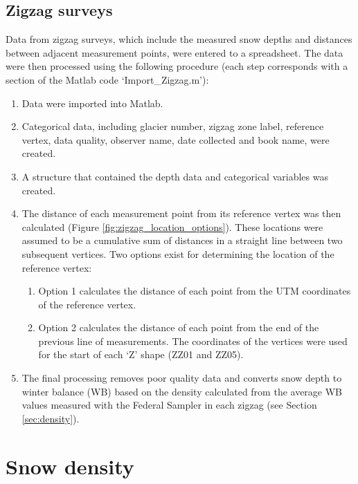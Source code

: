 \documentclass{sfuthesis}
\begin{document}
\begin{appendices}
\subsection{Zigzag surveys}

Data from zigzag surveys, which include the measured snow depths and distances between adjacent measurement points, were entered to a spreadsheet. The data were then processed using the following procedure (each step corresponds with a section of the Matlab code `Import\_Zigzag.m'):
\begin{enumerate}
\item Data were imported into Matlab.
\item Categorical data, including glacier number, zigzag zone label, reference vertex, data quality, observer name, date collected and book name, were created.
\item A structure that contained the depth data and categorical variables was created.
\item The distance of each measurement point from its reference vertex was then calculated (Figure \ref{fig:zigzag_location_options}). These locations were assumed to be a cumulative sum of distances in a straight line between two subsequent vertices. Two options exist for determining the location of the reference vertex:
 	\begin{enumerate}
	\item Option 1 calculates the distance of each point from the UTM coordinates of the reference vertex.
	\item Option 2 calculates the distance of each point from the end of the previous line of measurements. The coordinates of the vertices were used for the start of each `Z' shape (ZZ01 and ZZ05).
	\end{enumerate}
\item The final processing removes poor quality data and converts snow depth to winter balance (WB) based on the density calculated from the average WB values measured with the Federal Sampler in each zigzag (see Section \ref{sec:density}).
\end{enumerate}

\section{Snow density}


\end{appendices}
\end{document}
